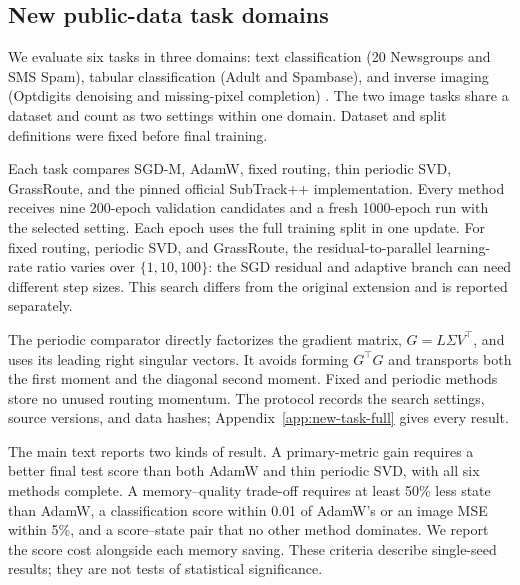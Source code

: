 \subsection{New public-data task domains}
\label{sec:new-public-tasks}
We evaluate six tasks in three domains: text classification (20 Newsgroups
and SMS Spam), tabular classification (Adult and Spambase), and inverse
imaging (Optdigits denoising and missing-pixel completion)
\cite{sklearn20newsdata,uci2011sms,uci1996adult,uci1999spambase,uci1998optdigits}.
The two image tasks share a dataset and count as two settings within one
domain. Dataset and split definitions were fixed before final training.



Each task compares SGD-M, AdamW, fixed routing, thin periodic SVD,
GrassRoute, and the pinned official SubTrack++ implementation. Every method
receives nine 200-epoch validation candidates and a fresh 1000-epoch run
with the selected setting. Each epoch uses the full training split in one
update. For fixed routing, periodic SVD, and GrassRoute, the
residual-to-parallel learning-rate ratio varies over $\{1,10,100\}$:
the SGD residual and adaptive branch can need
different step sizes. This search differs from the original extension and
is reported separately.

The periodic comparator directly factorizes the gradient matrix,
$G=L\Sigma V^\top$, and uses its leading right singular vectors. It avoids
forming $G^\top G$ and transports both the first moment and the diagonal
second moment. Fixed and periodic methods store no unused routing momentum.
The protocol records the search settings, source versions, and data hashes;
Appendix~\ref{app:new-task-full} gives every result.

The main text reports two kinds of result. A primary-metric gain requires a
better final test score than both AdamW and thin periodic SVD, with all six
methods complete. A memory--quality trade-off requires at least 50\% less
state than AdamW, a classification score within 0.01 of AdamW's or an image
MSE within 5\%, and a score--state pair that no other method dominates.
We report the score cost alongside each memory saving. These criteria
describe single-seed results; they are not tests of statistical significance.

\par




\par
